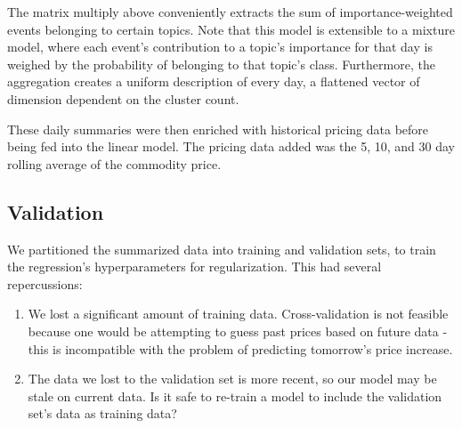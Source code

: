The matrix multiply above conveniently extracts the sum of importance-weighted events belonging to certain topics. Note that this model is extensible to a mixture model, where each event's contribution to a topic's importance for that day is weighed by the probability of belonging to that topic's class. Furthermore, the aggregation creates a uniform description of every day, a flattened vector of dimension dependent on the cluster count.

These daily summaries were then enriched with historical pricing data before being fed into the linear model. The pricing data added was the 5, 10, and 30 day rolling average of the commodity price. %

\subsection{Validation}

We partitioned the summarized data into training and validation sets, to train the regression's hyperparameters for regularization. This had several repercussions:
\begin{enumerate}
\item We lost a significant amount of training data. Cross-validation is not feasible because one would be attempting to guess past prices based on future data - this is incompatible with the problem of predicting tomorrow's price increase.
\item The data we lost to the validation set is more recent, so our model may be stale on current data. Is it safe to re-train a model to include the validation set's data as training data?
\end{enumerate}
